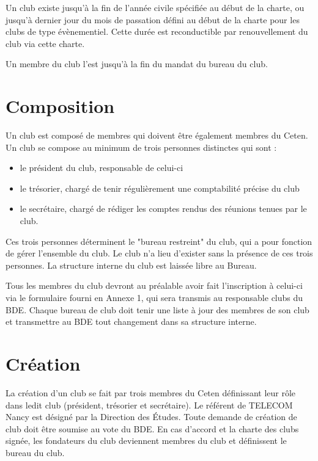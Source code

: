 \documentclass{article} %
\begin{document}
\begin{multicols}{2}
{			Un club existe jusqu’à la fin de l’année civile spécifiée au début
			de la charte, ou jusqu’à dernier jour du mois de passation défini au
			début de la charte pour les clubs de type évènementiel. Cette durée
			est reconductible par renouvellement du club via cette charte.

			Un membre du club l’est jusqu’à la fin du mandat du bureau du club.
			
		}

		\section{Composition}
		
		{\small
		
			Un club est composé de membres qui doivent être également membres du
			Ceten. Un club se compose au minimum de trois personnes distinctes
			qui sont :
			\begin{itemize}
				\item le président du club, responsable de celui-ci
				\item le trésorier, chargé de tenir régulièrement une
					comptabilité précise du club
				\item le secrétaire, chargé de rédiger les comptes rendus des 
					réunions tenues par le club.
			\end{itemize}
			Ces trois personnes déterminent le "bureau restreint" du club, qui a
			pour fonction de gérer l’ensemble du club. Le club n’a lieu
			d’exister sans la présence de ces trois personnes. La structure
			interne du club est laissée libre au Bureau.

			Tous les membres du club devront au préalable avoir fait
			l’inscription à celui-ci via le formulaire fourni en Annexe 1, qui
			sera transmis au responsable clubs du BDE\@.
			Chaque bureau de club doit tenir une liste à jour des membres de son
			club et transmettre au BDE tout changement dans sa structure
			interne.
			
		}
		
		\section{Création}
		
		{\small
		
			La création d’un club se fait par trois membres du Ceten définissant
			leur rôle dans ledit club (président, trésorier et secrétaire). Le
			référent de TELECOM Nancy est désigné par la Direction des Études.
			Toute demande de création de club doit être soumise au vote du BDE\@.
			En cas d’accord et la charte des clubs signée, les fondateurs du
			club deviennent membres du club et définissent le bureau du club.
			
}
\end{multicols}
\end{document}
